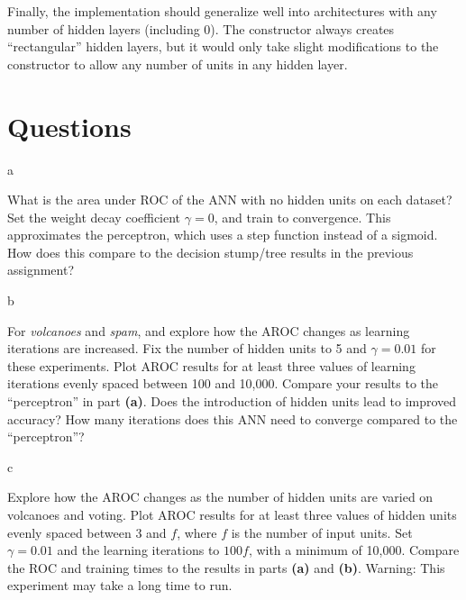\documentclass[fleqn]{homework}
\begin{document}
  Finally, the implementation should generalize well into architectures with any
  number of hidden layers (including 0).  The constructor always creates
  ``rectangular'' hidden layers, but it would only take slight modifications to
  the constructor to allow any number of units in any hidden layer.

  \section{Questions}

  \begin{problem}{a}
    \begin{question}
      What is the area under ROC of the ANN with no hidden units on each
      dataset? Set the weight decay coefficient $\gamma = 0$, and train to
      convergence. This approximates the perceptron, which uses a step function
      instead of a sigmoid. How does this compare to the decision stump/tree
      results in the previous assignment?
    \end{question}
  \end{problem}

  \begin{problem}{b}
    \begin{question}
      For \textit{volcanoes} and \textit{spam}, and explore how the AROC changes
      as learning iterations are increased. Fix the number of hidden units to 5
      and $\gamma = 0.01$ for these experiments. Plot AROC results for at least
      three values of learning iterations evenly spaced between 100 and
      10,000. Compare your results to the “perceptron” in part
      \textbf{(a)}. Does the introduction of hidden units lead to improved
      accuracy? How many iterations does this ANN need to converge compared to
      the “perceptron”?
    \end{question}
  \end{problem}

  \begin{problem}{c}
    \begin{question}
      Explore how the AROC changes as the number of hidden units are varied on
      volcanoes and voting.  Plot AROC results for at least three values of
      hidden units evenly spaced between 3 and $f$, where $f$ is the number of
      input units. Set $\gamma=0.01$ and the learning iterations to $100f$, with
      a minimum of 10,000.  Compare the ROC and training times to the results in
      parts \textbf{(a)} and \textbf{(b)}. Warning: This experiment may take a
      long time to run.
    \end{question}
  \end{problem}
\end{document}
